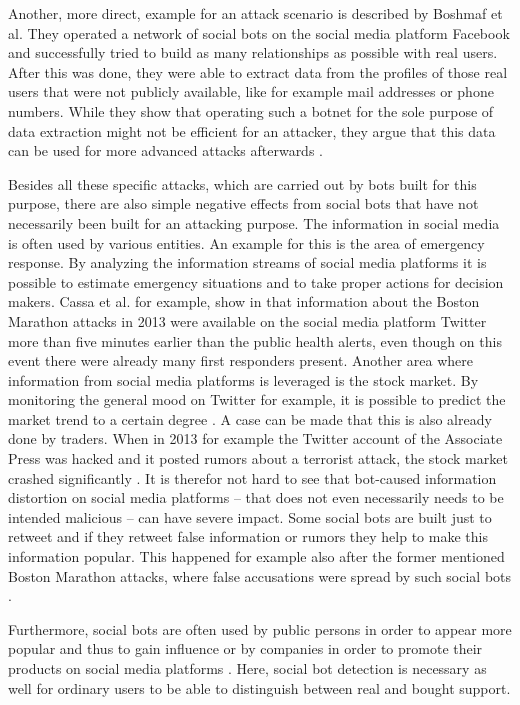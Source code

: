 Another, more direct, example for an attack scenario is described by Boshmaf et al. They operated a network of social bots on the social media platform Facebook and successfully tried to build as many relationships as possible with real users. After this was done, they were able to extract data from the profiles of those real users that were not publicly available, like for example mail addresses or phone numbers. While they show that operating such a botnet for the sole purpose of data extraction might not be efficient for an attacker, they argue that this data can be used for more advanced attacks afterwards \cite{boshmaf13}.

Besides all these specific attacks, which are carried out by bots built for this purpose, there are also simple negative effects from social bots that have not necessarily been built for an attacking purpose.
The information in social media is often used by various entities. An example for this is the area of emergency response. By analyzing the information streams of social media platforms it is possible to estimate emergency situations and to take proper actions for decision makers. Cassa et al. for example, show in \cite{cassa} that information about the Boston Marathon attacks in 2013 were available on the social media platform Twitter more than five minutes earlier than the public health alerts, even though on this event there were already many first responders present.  Another area where information from social media platforms is leveraged is the stock market. By monitoring the general mood on Twitter for example, it is possible to predict the market trend to a certain degree \cite{bollen}. A case can be made that this is also already done by traders. When in 2013 for example the Twitter account of the Associate Press was hacked and it posted rumors about a terrorist attack, the stock market crashed significantly \cite{ferrara15}. It is therefor not hard to see that bot-caused information distortion on social media platforms -- that does not even necessarily needs to be intended malicious -- can have severe impact. Some social bots are built just to retweet and if they retweet false information or rumors they help to make this information popular. This happened for example also after the former mentioned Boston Marathon attacks, where false accusations were spread by such social bots \cite{gupta}. 

Furthermore, social bots are often used by public persons in order to appear more popular and thus to gain influence or by companies in order to promote their products on social media platforms \cite{stringhini}. Here, social bot detection is necessary as well for ordinary users to be able to distinguish between real and bought support.

